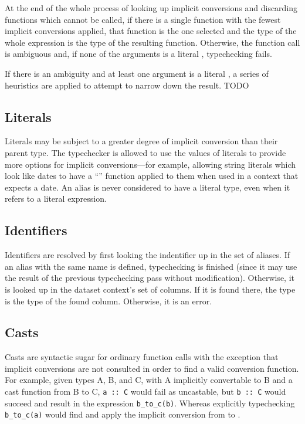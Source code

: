 \documentclass{article}
\begin{document}
At the end of the whole process of looking up implicit conversions and
discarding functions which cannot be called, if there is a single
function with the fewest implicit conversions applied, that function
is the one selected and the type of the whole expression is the type
of the resulting function.  Otherwise, the function call is ambiguous
and, if none of the arguments is a literal , typechecking
fails.

If there is an ambiguity and at least one argument is a literal
, a series of heuristics are applied to attempt to narrow
down the result.  TODO

\subsection{Literals}

Literals may be subject to a greater degree of implicit conversion
than their parent type.  The typechecker is allowed to use the values
of literals to provide more options for implicit conversions---for
example, allowing string literals which look like dates to have a
``'' function applied to them when used in a context
that expects a date.  An alias is never considered to have a literal
type, even when it refers to a literal expression.

\subsection{Identifiers}

Identifiers are resolved by first looking the indentifier up in the
set of aliases.  If an alias with the same name is defined,
typechecking is finished (since it may use the result of the previous
typechecking pass without modification).  Otherwise, it is looked up
in the dataset context's set of columns.  If it is found there, the
type is the type of the found column.  Otherwise, it is an error.

\subsection{Casts}

Casts are syntactic sugar for ordinary function calls with the
exception that implicit conversions are not consulted in order to find
a valid conversion function.  For example, given types A, B, and C,
with A implicitly convertable to B and a cast function 
from B to C, \lstinline|a :: C| would fail as uncastable, but
\lstinline|b :: C| would succeed and result in the expression
\lstinline|b_to_c(b)|.  Whereas explicitly typechecking
\lstinline|b_to_c(a)| would find and apply the implicit conversion
from  to .
\end{document}
